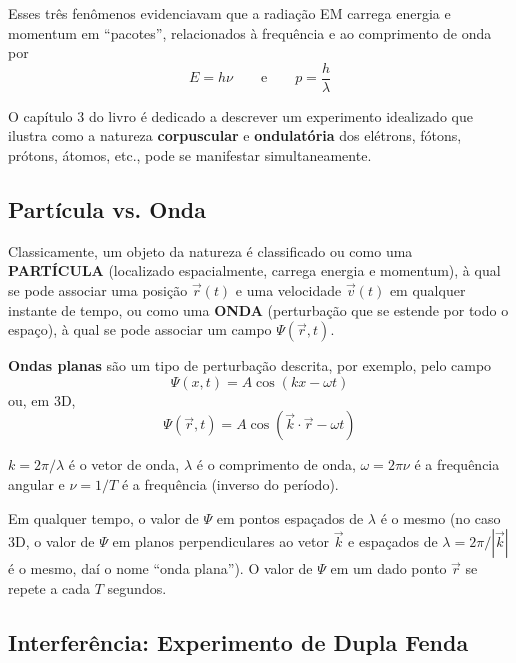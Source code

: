Esses três fenômenos evidenciavam que a radiação EM carrega energia e momentum em ``pacotes'', relacionados à frequência e ao comprimento de onda por
\begin{equation}
    E = h\nu \qquad \text{e} \qquad p = \frac{h}{\lambda}
\label{eq:aula10_E_p_pacotes}
\end{equation}

O capítulo 3 do livro é dedicado a descrever um experimento idealizado que ilustra como a natureza \textbf{corpuscular} e \textbf{ondulatória} dos elétrons, fótons, prótons, átomos, etc., pode se manifestar simultaneamente.

\subsection*{Partícula vs. Onda}

Classicamente, um objeto da natureza é classificado ou como uma \textbf{PARTÍCULA} (localizado espacialmente, carrega energia e momentum), à qual se pode associar uma posição $\vec{r}(t)$ e uma velocidade $\vec{v}(t)$ em qualquer instante de tempo, ou como uma \textbf{ONDA} (perturbação que se estende por todo o espaço), à qual se pode associar um campo $\Psi(\vec{r}, t)$.

\textbf{Ondas planas} são um tipo de perturbação descrita, por exemplo, pelo campo
\begin{equation}
    \Psi(x,t) = A\cos(kx - \omega t)
\label{eq:aula10_onda_plana_1d}
\end{equation}
ou, em 3D,
\begin{equation}
    \Psi(\vec{r}, t) = A\cos(\vec{k}\cdot\vec{r} - \omega t)
\label{eq:aula10_onda_plana_3d}
\end{equation}

$k = 2\pi/\lambda$ é o vetor de onda, $\lambda$ é o comprimento de onda, $\omega = 2\pi\nu$ é a frequência angular e $\nu = 1/T$ é a frequência (inverso do período).

Em qualquer tempo, o valor de $\Psi$ em pontos espaçados de $\lambda$ é o mesmo (no caso 3D, o valor de $\Psi$ em planos perpendiculares ao vetor $\vec{k}$ e espaçados de $\lambda = 2\pi/|\vec{k}|$ é o mesmo, daí o nome ``onda plana''). O valor de $\Psi$ em um dado ponto $\vec{r}$ se repete a cada $T$ segundos.

\subsection*{Interferência: Experimento de Dupla Fenda}


